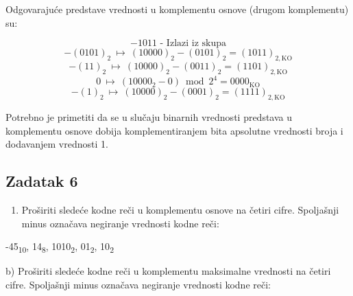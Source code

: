 \documentclass[a4paper,11pt]{article}
\numberwithin{equation}{section}
\begin{document}
Odgovarajuće predstave vrednosti u komplementu osnove (drugom komplementu) su:



\begin{equation}\label{eq:2.5.27}
\text{\(- 1011\) - Izlazi iz skupa}
\end{equation}
\begin{equation}\label{eq:2.5.28}
-(0101)_2\ \longmapsto\ (10000)_2-(0101)_2=(1011)_{2,\mathrm{KO}}
\end{equation}
\begin{equation}\label{eq:2.5.29}
-(11)_2\ \longmapsto\ (10000)_2-(0011)_2=(1101)_{2,\mathrm{KO}}
\end{equation}
\begin{equation}\label{eq:2.5.30}
0\ \longmapsto\ (10000_2-0)\bmod2^4=0000_{\mathrm{KO}}
\end{equation}
\begin{equation}\label{eq:2.5.31}
-(1)_2\ \longmapsto\ (10000)_2-(0001)_2=(1111)_{2,\mathrm{KO}}
\end{equation}


Potrebno je primetiti da se u slučaju binarnih vrednosti predstava u komplementu osnove dobija komplementiranjem bita apsolutne vrednosti broja i dodavanjem vrednosti 1.



\FloatBarrier
\subsection{Zadatak 6}\label{sec:2.6}


\begin{enumerate}[label=\alph*),start=1,leftmargin=*]
\item Proširiti sledeće kodne reči u komplementu osnove na četiri cifre. Spoljašnji minus označava negiranje vrednosti kodne reči:

\end{enumerate}


-45\textsubscript{10}, 14\textsubscript{8}, 1010\textsubscript{2}, 01\textsubscript{2}, 10\textsubscript{2}



b) Proširiti sledeće kodne reči u komplementu maksimalne vrednosti na četiri cifre. Spoljašnji minus označava negiranje vrednosti kodne reči:
\end{document}
